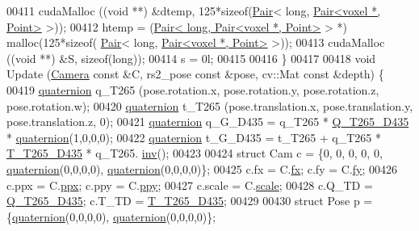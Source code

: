\begin{DoxyCode}
{00411         cudaMalloc ((\textcolor{keywordtype}{void} **) &dtemp, 125*\textcolor{keyword}{sizeof}(\hyperlink{classPair}{Pair}< \textcolor{keywordtype}{long}, 
      \hyperlink{classPair}{Pair<voxel *, Point>} >));
00412         htemp = (\hyperlink{classPair}{Pair< long, Pair<voxel *, Point>} > *) malloc(125*\textcolor{keyword}{sizeof}(
      \hyperlink{classPair}{Pair}< \textcolor{keywordtype}{long}, \hyperlink{classPair}{Pair<voxel *, Point>} >));
00413         cudaMalloc ((\textcolor{keywordtype}{void} **) &S, \textcolor{keyword}{sizeof}(\textcolor{keywordtype}{long}));
00414         s = 0l;
00415 
00416     \}
00417 
00418     \textcolor{keywordtype}{void} Update (\hyperlink{classCamera}{Camera} \textcolor{keyword}{const} &C, rs2\_pose \textcolor{keyword}{const} &pose, cv::Mat \textcolor{keyword}{const} &depth) \{
00419         \hyperlink{classquaternion}{quaternion} q\_T265 (pose.rotation.x, pose.rotation.y, pose.rotation.z, pose.rotation.w);
00420         \hyperlink{classquaternion}{quaternion} t\_T265 (pose.translation.x, pose.translation.y, pose.translation.z, 0);
00421         \hyperlink{classquaternion}{quaternion} q\_G\_D435 = q\_T265 * \hyperlink{Voxel_8hpp_ae638036c15a578080c34013047df2c4f}{Q\_T265\_D435} * 
      \hyperlink{classquaternion_a7939abaec2de1b11ff2208cbd8fbd93e}{quaternion}(1,0,0,0);
00422         \hyperlink{classquaternion}{quaternion} t\_G\_D435 = t\_T265 + q\_T265 * \hyperlink{Voxel_8hpp_a084c6bfb66f9daa4728fe8355861f1a4}{T\_T265\_D435} * q\_T265.
      \hyperlink{classquaternion_a52cd9cd03bc2613e56dd798cb1037a51}{inv}();
00423 
00424         \textcolor{keyword}{struct }Cam c = \{0, 0, 0, 0, 0, \hyperlink{classquaternion_a7939abaec2de1b11ff2208cbd8fbd93e}{quaternion}(0,0,0,0), \hyperlink{classquaternion_a7939abaec2de1b11ff2208cbd8fbd93e}{quaternion}(0,0,0,0)\};
00425         c.fx = C.\hyperlink{classCamera_a4f5e789525c1c9306028c080922582e2}{fx}; c.fy = C.\hyperlink{classCamera_a1472650e23f3df5f23dda7f94537e889}{fy};
00426         c.ppx = C.\hyperlink{classCamera_aa646a2de04e9ad37395dcf3c4a171abe}{ppx}; c.ppy = C.\hyperlink{classCamera_a0e51f157264b9c9e18feb584c5a6c606}{ppy};
00427         c.scale = C.\hyperlink{classCamera_a50152f7c8f2ce7601dd6086c90b3a65c}{scale};
00428         c.Q\_TD = \hyperlink{Voxel_8hpp_ae638036c15a578080c34013047df2c4f}{Q\_T265\_D435}; c.T\_TD = \hyperlink{Voxel_8hpp_a084c6bfb66f9daa4728fe8355861f1a4}{T\_T265\_D435};
00429 
00430         \textcolor{keyword}{struct }Pose p = \{\hyperlink{classquaternion_a7939abaec2de1b11ff2208cbd8fbd93e}{quaternion}(0,0,0,0), \hyperlink{classquaternion_a7939abaec2de1b11ff2208cbd8fbd93e}{quaternion}(0,0,0,0)\};
}
\end{DoxyCode}

